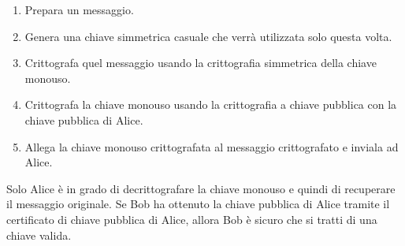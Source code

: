 \begin{enumerate}
    \item Prepara un messaggio.
    \item Genera una chiave simmetrica casuale che verrà utilizzata solo questa volta.
    \item Crittografa quel messaggio usando la crittografia simmetrica della chiave monouso.
    \item Crittografa la chiave monouso usando la crittografia a chiave pubblica con la chiave pubblica di Alice.
    \item Allega la chiave monouso crittografata al messaggio crittografato e inviala ad Alice.
\end{enumerate}

Solo Alice è in grado di decrittografare la chiave monouso e quindi di recuperare il messaggio originale. Se Bob ha ottenuto la chiave pubblica di Alice tramite il certificato di chiave pubblica di Alice, allora Bob è sicuro che si tratti di una chiave valida.
